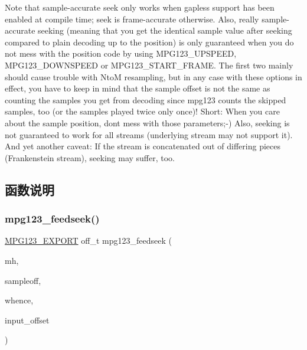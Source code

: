 Note that sample-\/accurate seek only works when gapless support has been enabled at compile time; seek is frame-\/accurate otherwise. Also, really sample-\/accurate seeking (meaning that you get the identical sample value after seeking compared to plain decoding up to the position) is only guaranteed when you do not mess with the position code by using M\+P\+G123\+\_\+\+U\+P\+S\+P\+E\+ED, M\+P\+G123\+\_\+\+D\+O\+W\+N\+S\+P\+E\+ED or M\+P\+G123\+\_\+\+S\+T\+A\+R\+T\+\_\+\+F\+R\+A\+ME. The first two mainly should cause trouble with NtoM resampling, but in any case with these options in effect, you have to keep in mind that the sample offset is not the same as counting the samples you get from decoding since mpg123 counts the skipped samples, too (or the samples played twice only once)! Short\+: When you care about the sample position, don\textquotesingle{}t mess with those parameters;-\/) Also, seeking is not guaranteed to work for all streams (underlying stream may not support it). And yet another caveat\+: If the stream is concatenated out of differing pieces (Frankenstein stream), seeking may suffer, too. 

\subsection{函数说明}
\mbox{\label{group__mpg123__seek_gab0b0e6ed9e4ba14f1ca0c1dd83be6f57}} 
\subsubsection{\texorpdfstring{mpg123\+\_\+feedseek()}{mpg123\_feedseek()}}
{\footnotesize\ttfamily \hyperlink{mpg123_8h_a2ba98cfba3f760879df70e755b2a61cc}{M\+P\+G123\+\_\+\+E\+X\+P\+O\+RT} off\+\_\+t mpg123\+\_\+feedseek (\begin{DoxyParamCaption}\item[{\hyperlink{group__mpg123__init_ga6728e2839a395f3a07d4514da659faca}{mpg123\+\_\+handle} $\ast$}]{mh,  }\item[{off\+\_\+t}]{sampleoff,  }\item[{int}]{whence,  }\item[{off\+\_\+t $\ast$}]{input\+\_\+offset }\end{DoxyParamCaption})}

